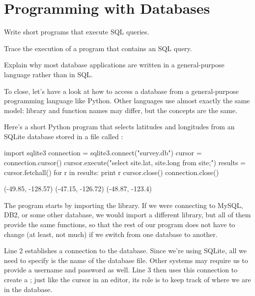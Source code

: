 \section{Programming with Databases}

\begin{objectives}
\begin{swcitemize}
\item
  Write short programs that execute SQL queries.
\item
  Trace the execution of a program that contains an SQL query.
\item
  Explain why most database applications are written in a
  general-purpose language rather than in SQL.
\end{swcitemize}
\end{objectives}

To close, let's have a look at how to access a database from a
general-purpose programming language like Python. Other languages use
almost exactly the same model: library and function names may differ,
but the concepts are the same.

Here's a short Python program that selects latitudes and longitudes from
an SQLite database stored in a file called :

\begin{VerbIn}
import sqlite3
connection = sqlite3.connect("survey.db")
cursor = connection.cursor()
cursor.execute("select site.lat, site.long from site;")
results = cursor.fetchall()
for r in results:
    print r
cursor.close()
connection.close()
\end{VerbIn}

\begin{VerbOut}
(-49.85, -128.57)
(-47.15, -126.72)
(-48.87, -123.4)
\end{VerbOut}

The program starts by importing the  library. If we were
connecting to MySQL, DB2, or some other database, we would import a
different library, but all of them provide the same functions, so that
the rest of our program does not have to change (at least, not much) if
we switch from one database to another.

Line 2 establishes a connection to the database. Since we're using
SQLite, all we need to specify is the name of the database file. Other
systems may require us to provide a username and password as well. Line
3 then uses this connection to create a ;
just like the cursor in an editor, its role is to keep track of where we
are in the database.

